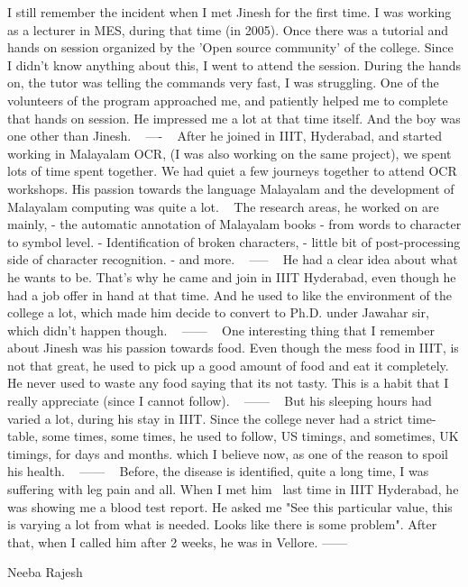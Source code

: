 \newpage
{}
I still remember the incident when I met Jinesh for the first time. I was working as a lecturer in MES, during that time (in 2005). Once there was a tutorial and hands on session organized by the 'Open source community' of the college. Since I didn’t know anything about this, I went to attend the session. During the hands on, the tutor was telling the commands very fast, I was struggling. One of the volunteers of the program approached me, and patiently helped me to complete that hands on session. He impressed me a lot at that time itself. And the boy was one other than Jinesh.
 
----
 
After he joined in IIIT, Hyderabad, and started working in Malayalam OCR, (I was also working on the same project), we spent lots of time spent together. We had quiet a few journeys together to attend OCR workshops. His passion towards the language Malayalam and the development of Malayalam computing was quite a lot.
 
The research areas, he worked on are mainly,
- the automatic annotation of Malayalam books - from words to character to symbol level.
- Identification of broken characters,
- little bit of post-processing side of character recognition.
- and more.
 
-----
 
He had a clear idea about what he wants to be. That’s why he came and join in IIIT Hyderabad, even though he had a job offer in hand at that time. And he used to like the environment of the college a lot, which made him decide to convert to Ph.D. under Jawahar sir, which didn’t happen though.
 
------
 
One interesting thing that I remember about Jinesh was his passion towards food. Even though the mess food in IIIT, is not that great, he used to pick up a good amount of food and eat it completely. He never used to waste any food saying that its not tasty. This is a habit that I really appreciate (since I cannot follow).
 
------
 
But his sleeping hours had varied a lot, during his stay in IIIT. Since the college never had a strict time-table, some times, some times, he used to follow, US timings, and sometimes, UK timings, for days and months. which I believe now, as one of the reason to spoil his health.
 
------
 
Before, the disease is identified, quite a long time, I was suffering with leg pain and all. When I met him  last time in IIIT Hyderabad, he was showing me a blood test report. He asked me "See this particular value, this is varying a lot from what is needed. Looks like there is some problem". After that, when I called him after 2 weeks, he was in Vellore.
------

Neeba Rajesh
\newpage
